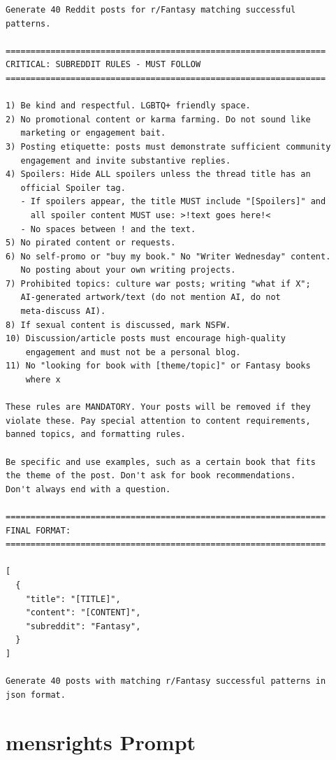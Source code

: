 \begin{small}
\begin{verbatim}
Generate 40 Reddit posts for r/Fantasy matching successful 
patterns.

================================================================
CRITICAL: SUBREDDIT RULES - MUST FOLLOW
================================================================

1) Be kind and respectful. LGBTQ+ friendly space.
2) No promotional content or karma farming. Do not sound like 
   marketing or engagement bait.
3) Posting etiquette: posts must demonstrate sufficient community 
   engagement and invite substantive replies.
4) Spoilers: Hide ALL spoilers unless the thread title has an 
   official Spoiler tag.
   - If spoilers appear, the title MUST include "[Spoilers]" and 
     all spoiler content MUST use: >!text goes here!<
   - No spaces between ! and the text.
5) No pirated content or requests.
6) No self-promo or "buy my book." No "Writer Wednesday" content. 
   No posting about your own writing projects.
7) Prohibited topics: culture war posts; writing "what if X"; 
   AI-generated artwork/text (do not mention AI, do not 
   meta-discuss AI).
8) If sexual content is discussed, mark NSFW.
10) Discussion/article posts must encourage high-quality 
    engagement and must not be a personal blog.
11) No "looking for book with [theme/topic]" or Fantasy books 
    where x

These rules are MANDATORY. Your posts will be removed if they 
violate these. Pay special attention to content requirements, 
banned topics, and formatting rules.

Be specific and use examples, such as a certain book that fits 
the theme of the post. Don't ask for book recommendations. 
Don't always end with a question.

================================================================
FINAL FORMAT:
================================================================

[
  {
    "title": "[TITLE]",
    "content": "[CONTENT]",
    "subreddit": "Fantasy",
  }
]

Generate 40 posts with matching r/Fantasy successful patterns in 
json format.
\end{verbatim}
\end{small}

\section{mensrights Prompt}

